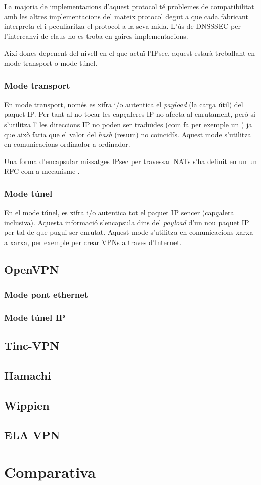 La majoria de implementacions d'aquest protocol té problemes de compatibilitat amb les altres implementacions del mateix protocol degut a que cada fabricant interpreta el  i peculiaritza el protocol a la seva mida. L'ús de DNSSSEC per l'intercanvi de claus no es troba en gaires implementacions.

Així doncs depenent del nivell en el que actuï l'IPsec, aquest estarà treballant en mode transport o mode túnel.
\subsubsection{Mode transport}
En mode transport, només es xifra i/o autentica el \emph{payload} (la carga útil) del paquet IP. Per tant al no tocar les capçaleres IP no afecta al enrutament, però si s'utilitza l' les direccions IP no poden ser traduïdes (com fa per exemple un ) ja que això faria que el valor del \emph{hash} (resum) no coincidís. Aquest mode s'utilitza en comunicacions ordinador a ordinador.

Una forma d'encapsular missatges IPsec per travessar NATs s'ha definit en un un RFC com a mecanisme .
\subsubsection{Mode túnel}
En el mode túnel, es xifra i/o autentica tot el paquet IP sencer (capçalera inclusiva). Aquesta informació s'encapsula dins del \emph{payload} d'un nou paquet IP per tal de que pugui ser enrutat. Aquest mode s'utilitza en comunicacions xarxa a xarxa, per exemple per crear VPNs a traves d'Internet.

\subsection{OpenVPN}

\subsubsection{Mode pont ethernet}

\subsubsection{Mode túnel IP}

\subsection{Tinc-VPN}
\subsection{Hamachi}
\subsection{Wippien}
\subsection{ELA VPN}
\section{Comparativa}
